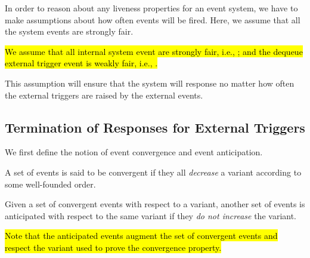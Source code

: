 In order to reason about any liveness properties for an event system,
we have to make assumptions about how often events will be fired.
Here, we assume that all the system events are strongly fair.
\begin{assumption}
  \label{asm:SF}
  \hl{%
    We assume that all internal system event \mbox{}
    are strongly fair, i.e., \mbox{}; and the
    dequeue external trigger event is weakly fair,
    i.e., \mbox{}.%
  }
\end{assumption}
This assumption will ensure that the system will response no matter
how often the external triggers are raised by the external events.

\subsection{Termination of Responses for External Triggers}
\label{sec:contr-rema-resp}

We first define the notion of event convergence and event
anticipation.
\begin{definition}
  \label{def:conv}
  A set of events is said to be convergent if they all \emph{decrease}
  a variant according to some well-founded order.
\end{definition}

\begin{definition}
  \label{def:anticipated}
  Given a set of convergent events with respect to a variant,
  another set of events is anticipated with respect to the
  same variant if they \emph{do not increase} the variant.
\end{definition}
\hl{%
  Note that the anticipated events augment the set of convergent
  events and respect the variant used to prove the
  convergence property.%
}

